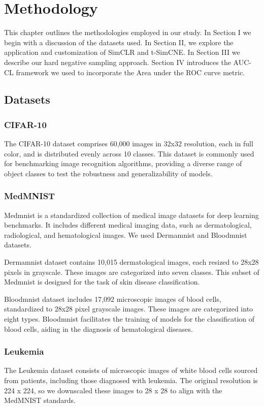 \chapter{Methodology}

This chapter outlines the methodologies employed in our study. In Section I we begin with a discussion of the datasets used. In Section II, we explore the application and customization of SimCLR and t-SimCNE. In Section III we describe our hard negative sampling approach.
Section IV introduces the AUC-CL framework we used to incorporate the Area under the ROC curve metric.

\section{Datasets}
\subsection{CIFAR-10}
The CIFAR-10 dataset \cite{cifar10} comprises 60,000 images in 32x32 resolution, each in full color, and is distributed evenly across 10 classes. This dataset is commonly used for benchmarking image recognition algorithms, providing a diverse range of object classes to test the robustness and generalizability of models.


\subsection{MedMNIST}
Medmnist \cite{medmnist} is a standardized collection of medical image datasets for deep learning benchmarks. It includes different medical imaging data, such as dermatological, radiological, and hematological images. We used Dermamnist and Bloodmnist datasets.

Dermamnist dataset contains 10,015 dermatological images, each resized to 28x28 pixels in grayscale. These images are categorized into seven classes. This subset of Medmnist is designed for the task of skin disease classification.

Bloodmnist dataset includes 17,092 microscopic images of blood cells, standardized to 28x28 pixel grayscale images. These images are categorized into eight types. Bloodmnist facilitates the training of models for the classification of blood cells, aiding in the diagnosis of hematological diseases.

\subsection{Leukemia}
The Leukemia dataset \cite{leukemia} consists of microscopic images of white blood cells sourced from patients, including those diagnosed with leukemia. The original resolution is 224 x 224, so we downscaled these images to 28 x 28 to align with the MedMNIST standards.


